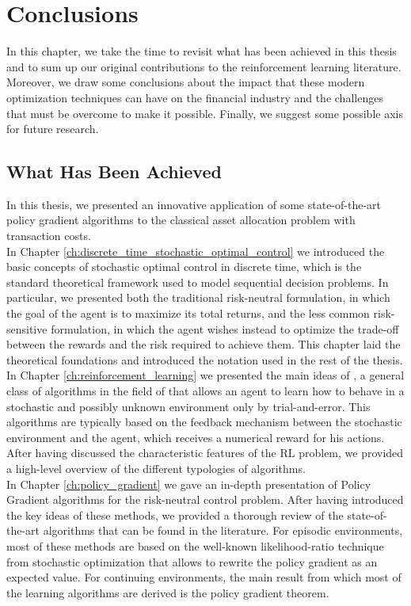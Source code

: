 \chapter{Conclusions}
\label{ch:conlusions}

In this chapter, we take the time to revisit what has been achieved in this thesis and to sum up our original contributions to the reinforcement learning literature. Moreover, we draw some conclusions about the impact that these modern optimization techniques can have on the financial industry and the challenges that must be overcome to make it possible. Finally, we suggest some possible axis for future research. 

\section{What Has Been Achieved}
In this thesis, we presented an innovative application of some state-of-the-art policy gradient algorithms to the classical asset allocation problem with transaction costs.\\ In Chapter \ref{ch:discrete_time_stochastic_optimal_control} we introduced the basic concepts of stochastic optimal control in discrete time, which is the standard theoretical framework used to model sequential decision problems. In particular, we presented both the traditional risk-neutral formulation, in which the goal of the agent is to maximize its total returns, and the less common risk-sensitive formulation, in which the agent wishes instead to optimize the trade-off between the rewards and the risk required to achieve them. This chapter laid the theoretical foundations and introduced the notation used in the rest of the thesis.\\  
In Chapter \ref{ch:reinforcement_learning} we presented the main ideas of , a general class of algorithms in the field of  that allows an agent to learn how to behave in a stochastic and possibly unknown environment only by trial-and-error. This algorithms are typically based on the feedback mechanism between the stochastic environment and the agent, which receives a numerical reward for his actions. After having discussed the characteristic features of the \gls{RL} problem, we provided a high-level overview of the different typologies of algorithms.\\
In Chapter \ref{ch:policy_gradient} we gave an in-depth presentation of Policy Gradient algorithms for the risk-neutral control problem. After having introduced the key ideas of these methods, we provided a thorough review of the state-of-the-art algorithms that can be found in the literature. For episodic environments, most of these methods are based on the well-known likelihood-ratio technique from stochastic optimization  that allows to rewrite the policy gradient as an expected value. For continuing environments, the main result from which most of the learning algorithms are derived is the policy gradient theorem.\\ 
